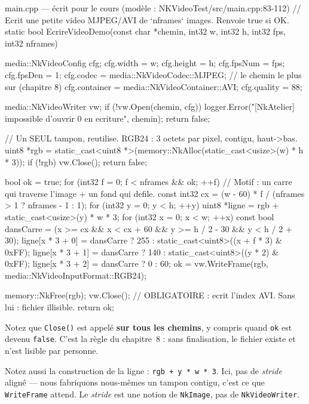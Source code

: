 \begin{nkcode}{main.cpp — écrit pour le cours (modèle : NKVideoTest/src/main.cpp:83-112)}
// Ecrit une petite video MJPEG/AVI de `nframes` images. Renvoie true si OK.
static bool EcrireVideoDemo(const char *chemin, int32 w, int32 h, int32 fps, int32 nframes) {
    media::NkVideoConfig cfg;
    cfg.width = w;
    cfg.height = h;
    cfg.fpsNum = fps;
    cfg.fpsDen = 1;
    cfg.codec = media::NkVideoCodec::MJPEG;        // le chemin le plus sur (chapitre 8)
    cfg.container = media::NkVideoContainer::AVI;
    cfg.quality = 88;

    media::NkVideoWriter vw;
    if (!vw.Open(chemin, cfg)) {
        logger.Error("[NkAtelier] impossible d'ouvrir {0} en ecriture", chemin);
        return false;
    }

    // Un SEUL tampon, reutilise. RGB24 : 3 octets par pixel, contigu, haut->bas.
    uint8 *rgb = static_cast<uint8 *>(memory::NkAlloc(static_cast<usize>(w) * h * 3));
    if (!rgb) {
        vw.Close();
        return false;
    }

    bool ok = true;
    for (int32 f = 0; f < nframes && ok; ++f) {
        // Motif : un carre qui traverse l'image + un fond qui defile.
        const int32 cx = (w - 60) * f / (nframes > 1 ? nframes - 1 : 1);
        for (int32 y = 0; y < h; ++y) {
            uint8 *ligne = rgb + static_cast<usize>(y) * w * 3;
            for (int32 x = 0; x < w; ++x) {
                const bool dansCarre = (x >= cx && x < cx + 60 && y >= h / 2 - 30 && y < h / 2 + 30);
                ligne[x * 3 + 0] = dansCarre ? 255 : static_cast<uint8>((x + f * 3) & 0xFF);
                ligne[x * 3 + 1] = dansCarre ? 140 : static_cast<uint8>((y * 2) & 0xFF);
                ligne[x * 3 + 2] = dansCarre ? 0   : 60;
            }
        }
        ok = vw.WriteFrame(rgb, media::NkVideoInputFormat::RGB24);
    }

    memory::NkFree(rgb);
    vw.Close();          // OBLIGATOIRE : ecrit l'index AVI. Sans lui : fichier illisible.
    return ok;
}
\end{nkcode}

Notez que \texttt{Close()} est appelé \textbf{sur tous les chemins}, y compris
quand \texttt{ok} est devenu \texttt{false}. C'est la règle du chapitre~8 : sans
finalisation, le fichier existe et n'est lisible par personne.

Notez aussi la construction de la ligne : \texttt{rgb + y * w * 3}. Ici, pas de
\emph{stride} aligné — nous fabriquons nous-mêmes un tampon contigu, c'est ce que
\texttt{WriteFrame} attend. Le \emph{stride} est une notion de \texttt{NkImage},
pas de \texttt{NkVideoWriter}.

